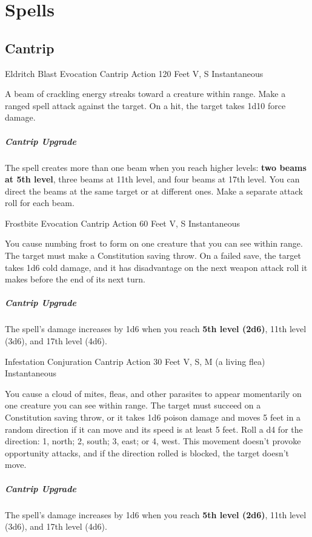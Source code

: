 \documentclass[letterpaper,openany,oneside,twocolumn]{book}
\begin{document}
\section*{Spells}
\subsection*{Cantrip}

\DndSpellHeader
  {Eldritch Blast}
  {Evocation Cantrip}
  {Action}
  {120 Feet}
  {V, S}
  {Instantaneous}

A beam of crackling energy streaks toward a creature within range. Make a ranged spell attack against the target. On a hit, the target takes 1d10 force damage.

\subparagraph*{Cantrip Upgrade} The spell creates more than one beam when you reach higher levels: \textbf{two beams at 5th level}, three beams at 11th level, and four beams at 17th level. You can direct the beams at the same target or at different ones. Make a separate attack roll for each beam.

\DndSpellHeader
  {Frostbite}
  {Evocation Cantrip}
  {Action}
  {60 Feet}
  {V, S}
  {Instantaneous}

You cause numbing frost to form on one creature that you can see within range. The target must make a Constitution saving throw. On a failed save, the target takes 1d6 cold damage, and it has disadvantage on the next weapon attack roll it makes before the end of its next turn.

\subparagraph*{Cantrip Upgrade} The spell's damage increases by 1d6 when you reach \textbf{5th level (2d6)}, 11th level (3d6), and 17th level (4d6).

\DndSpellHeader
  {Infestation}
  {Conjuration Cantrip}
  {Action}
  {30 Feet}
  {V, S, M (a living flea)}
  {Instantaneous}

You cause a cloud of mites, fleas, and other parasites to appear momentarily on one creature you can see within range. The target must succeed on a Constitution saving throw, or it takes 1d6 poison damage and moves 5 feet in a random direction if it can move and its speed is at least 5 feet. Roll a d4 for the direction: 1, north; 2, south; 3, east; or 4, west. This movement doesn't provoke opportunity attacks, and if the direction rolled is blocked, the target doesn't move.

\subparagraph*{Cantrip Upgrade} The spell's damage increases by 1d6 when you reach \textbf{5th level (2d6)}, 11th level (3d6), and 17th level (4d6).
\end{document}
